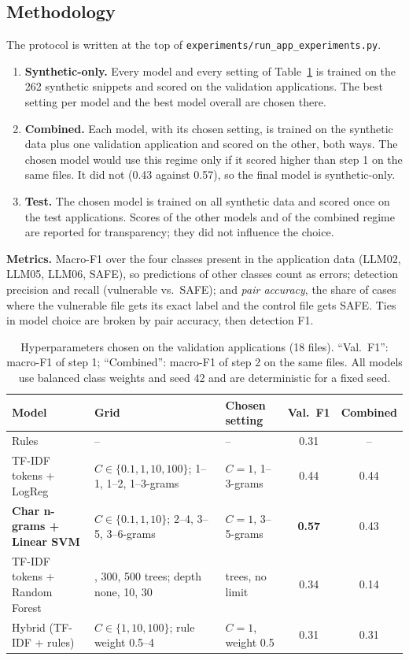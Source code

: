 \documentclass[11pt,a4paper]{article}
\newcommand{\code}[1]{\texttt{#1}}
\begin{document}
\subsection{Methodology}

The protocol is written at the top of \code{experiments/run\_app\_experiments.py}.
\begin{enumerate}
  \item \textbf{Synthetic-only.} Every model and every setting of Table~\ref{tab:apphp} is
        trained on the 262 synthetic snippets and scored on the validation applications.
        The best setting per model and the best model overall are chosen there.
  \item \textbf{Combined.} Each model, with its chosen setting, is trained on the
        synthetic data plus one validation application and scored on the other, both ways.
        The chosen model would use this regime only if it scored higher than step 1 on the
        same files. It did not (0.43 against 0.57), so the final model is synthetic-only.
  \item \textbf{Test.} The chosen model is trained on all synthetic data and scored once
        on the test applications. Scores of the other models and of the combined regime
        are reported for transparency; they did not influence the choice.
\end{enumerate}

\textbf{Metrics.} Macro-F1 over the four classes present in the application data
(LLM02, LLM05, LLM06, SAFE), so predictions of other classes count as errors;
detection precision and recall (vulnerable vs.\ SAFE); and \emph{pair accuracy}, the share
of cases where the vulnerable file gets its exact label and the control file gets SAFE.
Ties in model choice are broken by pair accuracy, then detection F1.

\begin{table}[H]
\centering\small
\begin{tabularx}{\linewidth}{@{}>{\raggedright\arraybackslash}p{3.4cm} >{\raggedright\arraybackslash}X >{\raggedright\arraybackslash}p{2.7cm} c c@{}}
\toprule
Model & Grid & Chosen setting & Val.\ F1 & Combined \\
\midrule
Rules & -- & -- & 0.31 & -- \\
TF-IDF tokens + LogReg & $C\in\{0.1,1,10,100\}$; 1--1, 1--2, 1--3-grams & $C=1$, 1--3-grams & 0.44 & 0.44 \\
\textbf{Char n-grams + Linear SVM} & $C\in\{0.1,1,10\}$; 2--4, 3--5, 3--6-grams & $C=1$, 3--5-grams & \textbf{0.57} & 0.43 \\
TF-IDF tokens + Random Forest & 100, 300, 500 trees; depth none, 10, 30 & 100 trees, no limit & 0.34 & 0.14 \\
Hybrid (TF-IDF + rules) & $C\in\{1,10,100\}$; rule weight 0.5--4 & $C=1$, weight 0.5 & 0.31 & 0.31 \\
\bottomrule
\end{tabularx}
\caption{Hyperparameters chosen on the validation applications (18 files). ``Val.\ F1'': macro-F1 of
step 1; ``Combined'': macro-F1 of step 2 on the same files. All models use balanced class
weights and seed 42 and are deterministic for a fixed seed.}
\label{tab:apphp}
\end{table}
\end{document}
